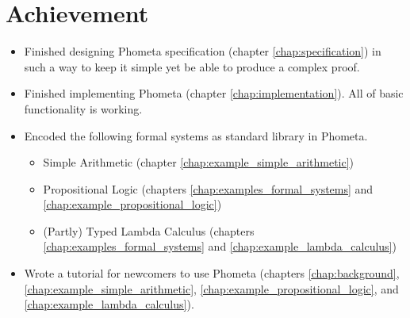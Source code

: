 \documentclass[master.tex]{subfiles}
\begin{document}
\section{Achievement}
\begin{itemize}
\item Finished designing Phometa specification (chapter
  \ref{chap:specification}) in such a way to keep it simple yet be able to
  produce a complex proof.
\item Finished implementing Phometa (chapter \ref{chap:implementation}). All of
  basic functionality is working.
\item Encoded the following formal systems as standard library in Phometa.
  \begin{itemize}
  \item Simple Arithmetic (chapter \ref{chap:example_simple_arithmetic})
  \item Propositional Logic (chapters \ref{chap:examples_formal_systems} and
    \ref{chap:example_propositional_logic})
  \item (Partly) Typed Lambda Calculus (chapters
    \ref{chap:examples_formal_systems} and \ref{chap:example_lambda_calculus})
  \end{itemize}
\item Wrote a tutorial for newcomers to use Phometa (chapters
  \ref{chap:background}, \ref{chap:example_simple_arithmetic},
  \ref{chap:example_propositional_logic}, and
  \ref{chap:example_lambda_calculus}).
\end{itemize}
\end{document}
